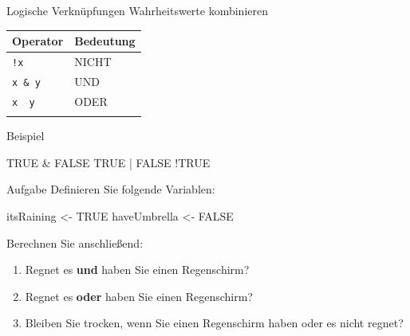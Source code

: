 \documentclass[
  10pt,
  ignorenonframetext,
  aspectratio=169,
]{beamer}
\newenvironment{Shaded}{}{}
\newcommand{\ConstantTok}[1]{\textcolor[rgb]{0.53,0.00,0.00}{#1}}
\newcommand{\NormalTok}[1]{#1}
\newcommand{\OtherTok}[1]{\textcolor[rgb]{0.00,0.44,0.13}{#1}}
\newcommand{\SpecialCharTok}[1]{\textcolor[rgb]{0.25,0.44,0.63}{#1}}
\providecommand{\tightlist}{%
  \setlength{\itemsep}{0pt}\setlength{\parskip}{0pt}}
\begin{document}
\begin{frame}[fragile]{Logische Verknüpfungen}
\label{logische-verknuxfcpfungen}
Wahrheitswerte kombinieren

\begin{longtable}[]{@{}ll@{}}
\toprule\noalign{}
Operator & Bedeutung \\
\midrule\noalign{}
\endhead
\texttt{!x} & NICHT \\
\texttt{x\ \&\ y} & UND \\
\texttt{x\ \textbar{}\ y} & ODER \\
\bottomrule\noalign{}
\end{longtable}

Beispiel

\begin{Shaded}
\begin{Highlighting}[]
\ConstantTok{TRUE} \SpecialCharTok{\&} \ConstantTok{FALSE}
\ConstantTok{TRUE} \SpecialCharTok{|} \ConstantTok{FALSE}
\SpecialCharTok{!}\ConstantTok{TRUE}
\end{Highlighting}
\end{Shaded}
\end{frame}

\begin{frame}[fragile]{Aufgabe}
\label{aufgabe}
Definieren Sie folgende Variablen:

\begin{Shaded}
\begin{Highlighting}[]
\NormalTok{itsRaining }\OtherTok{\textless{}{-}} \ConstantTok{TRUE}
\NormalTok{haveUmbrella }\OtherTok{\textless{}{-}} \ConstantTok{FALSE}
\end{Highlighting}
\end{Shaded}

Berechnen Sie anschließend:

\begin{enumerate}
\tightlist
\item
  Regnet es \textbf{und} haben Sie einen Regenschirm?
\item
  Regnet es \textbf{oder} haben Sie einen Regenschirm?
\item
  Bleiben Sie trocken, wenn Sie einen Regenschirm haben oder es nicht
  regnet?
\end{enumerate}
\end{frame}
\end{document}
